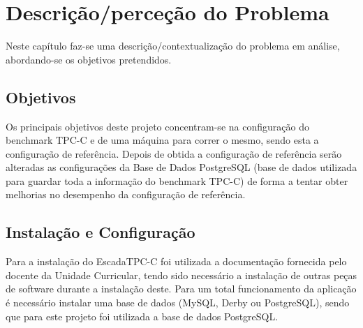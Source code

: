 \chapter{Descrição/perceção do Problema} \label{chap:contex}

\hspace{5mm} Neste capítulo faz-se uma descrição/contextualização do problema em análise, abordando-se os objetivos pretendidos.

\section{Objetivos}

\hspace{5mm} Os principais objetivos deste projeto concentram-se na configuração do benchmark TPC-C e de uma máquina para correr o mesmo, sendo esta a configuração de referência. Depois de obtida a configuração de referência serão alteradas as configurações da Base de Dados PostgreSQL (base de dados utilizada para guardar toda a informação do benchmark TPC-C) de forma a tentar obter melhorias no desempenho da configuração de referência.

\section{Instalação e Configuração}

\hspace{5mm} Para a instalação do EscadaTPC-C foi utilizada a documentação fornecida pelo docente da Unidade Curricular, tendo sido necessário a instalação de outras peças de software durante a instalação deste. Para um total funcionamento da aplicação é necessário instalar uma base de dados (MySQL, Derby ou PostgreSQL), sendo que para este projeto foi utilizada a base de dados PostgreSQL.